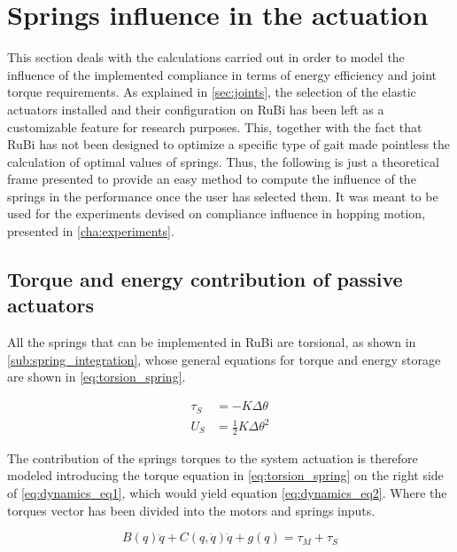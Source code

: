 
\section{Springs influence in the actuation}
\label{sec_springs}
This section deals with the calculations carried out in order to model the influence of the implemented compliance in terms of energy efficiency and joint torque requirements.
As explained in \ref{sec:joints}, the selection of the elastic actuators installed and their configuration on RuBi has been left as a customizable feature for research purposes.
This, together with the fact that RuBi has not been designed to optimize a specific type of gait made pointless the calculation of optimal values of springs.
Thus, the following is just a theoretical frame presented to provide an easy method to compute the influence of the springs in the performance once the user has selected them.
It was meant to be used for the experiments devised on compliance influence in hopping motion, presented in \ref{cha:experiments}.

\subsection{Torque and energy contribution of passive actuators} %
\label{sub:torque_contribution_of_passive_actuators}
All the springs that can be implemented in RuBi are torsional, as shown in \ref{sub:spring_integration}, whose general equations for torque and energy storage are shown in \ref{eq:torsion_spring}. 

\begin{equation}
\label{eq:torsion_spring}
\begin{aligned}
	\tau_{S} &= -K \Delta \theta \\
	U_{S} &= \frac{1}{2}K \Delta \theta^2
\end{aligned}
\end{equation}

The contribution of the springs torques to the system actuation is therefore modeled introducing the torque equation in \ref{eq:torsion_spring} on the right side of \ref{eq:dynamics_eq1}, which would yield equation \ref{eq:dynamics_eq2}.
Where the torques vector has been divided into the motors and springs inputs.

\begin{equation}
	\label{eq:dynamics_eq2}
	B(q)\ddot{q} + C(q,\dot{q})\dot{q} + g(q) = \tau_{M} + \tau_{S}
\end{equation}

